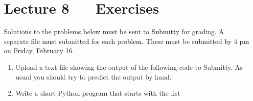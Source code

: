 \documentclass[letterpaper,10pt,english]{sphinxmanual}
\begin{document}
\chapter{Lecture 8 — Exercises}
\label{\detokenize{lecture_notes/lec08_lists1_exercises/exercises:lecture-8-exercises}}\label{\detokenize{lecture_notes/lec08_lists1_exercises/exercises::doc}}
Solutions to the problems below must be sent to Submitty for grading.
A separate file must submitted for each problem.  These must be
submitted by 4 pm on Friday, February 16.
\begin{enumerate}
\item {} 
Upload a text file showing the output of the following code to
Submitty.  As usual you should try to predict the output by hand.

%
\begin{sphinxVerbatim}[commandchars=\\\{\}]
  \PYG{p}{[}     \PYG{p}{]}
\PYG{p}{[}\PYG{p}{]} \PYG{p}{[}\PYG{p}{]}
  
  
 \PYG{p}{[}\PYG{p}{]} 
 \PYG{p}{[} \PYG{p}{]} 
\PYG{p}{[}\PYG{p}{]}  \PYG{p}{[}\PYG{p}{]}
\PYG{p}{[}\PYG{p}{]}  \PYG{p}{[}\PYG{p}{]}\PYG{p}{[}\PYG{p}{]}
\PYG{p}{[}\PYG{p}{]}
\PYG{p}{[}\PYG{p}{]}
\end{sphinxVerbatim}

\item {} 
Write a short Python program that starts with the list


\end{enumerate}
\end{document}
